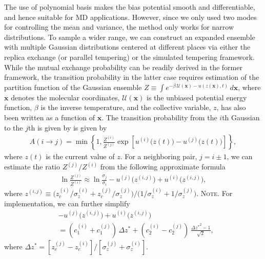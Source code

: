 \documentclass[reprint, superscriptaddress, floatfix]{revtex4-1}
\newcommand{\note}[1]{{\color{DarkGreen}\footnotesize \textsc{Note.} #1}}
\begin{document}
The use of polynomial basis makes
the bias potential smooth and differentiable,
and hence suitable for MD applications.\cite{zhu2012}
%
However, since we only used two modes
for controlling the mean and variance,
the method only works
for narrow distributions.
%
To sample a wider range,
we can construct an expanded ensemble with
multiple Gaussian distributions
centered at different places via
either the replica exchange
(or parallel tempering)\cite{swendsen1986,
*geyer1991, *hukushima1996, *hansmann1997}
or the simulated tempering\cite{marinari1992,
  *lyubartsev1992, li2007,
  park2007, *nguyen2013, *zhang2015st}
framework.
%
While the mutual exchange probability
can be readily derived in the former
framework\cite{neuhaus2006, *neuhaus2007},
the transition probability in the latter case
requires estimation of the partition function
of the Gaussian ensemble
$Z \equiv \int e^{-\beta \, \mathcal U(\mathbf x)-u(z(\mathbf x),t)} \, d\mathbf x$,
where $\mathbf x$ denotes the molecular coordinates,
$\mathcal U(\mathbf x)$ is the unbiased potential energy function,
$\beta$ is the inverse temperature,
and the collective variable, $z$,
has also been written as a function of $\mathbf x$.
%
The transition probability from
the $i$th Gaussian to the $j$th is given by
is given by
\begin{align*}
A(i\to j) =
\min\left\{1,
  \frac{Z^{(i)}}{Z^{(j)}}
  \exp\left[u^{(i)}\bigl( z(t) \bigr)
   - u^{(j)}\bigl( z(t) \bigr) \right]
  \right\}
  ,
\end{align*}
where $z(t)$ is the current value of $z$.
%
For a neighboring pair, $j = i\pm 1$,
we can estimate the ratio $Z^{(j)}/Z^{(i)}$
from the following approximate formula
%
\begin{align*}
  \ln\frac{ Z^{(j)} }{ Z^{(i)} }
  \approx
  \ln\frac{ \sigma_j }{ \sigma_i }
   -u^{(j)}\bigl( z^{(i,j)} \bigr)
   +u^{(i)}\bigl( z^{(i,j)} \bigr)
  ,
\end{align*}
%
where
$z^{(i,j)} \equiv
\bigl( z_c^{(i)}/\sigma_z^{(i)} + z_c^{(j)}/\sigma_z^{(j)} \bigr) /
\bigl(         1/\sigma_z^{(i)} +         1/\sigma_z^{(j)} \bigr)$.
\note{For implementation, we can further simplify
\begin{align*}
  &-u^{(j)}\bigl( z^{(i,j)} \bigr)
   +u^{(i)}\bigl( z^{(i,j)} \bigr)
   \\
   &=
   (c_1^{(i)} + c_1^{(j)}) \, \Delta z^*
   +
   (c_2^{(i)} - c_2^{(j)}) \, \frac{{\Delta z^*}^2 - 1} {\sqrt 2}
   ,
\end{align*}
where $\Delta z^* = [z_c^{(j)} - z_c^{(i)}]/[\sigma_z^{(j)} + \sigma_z^{(i)}]$.
}
\end{document}
